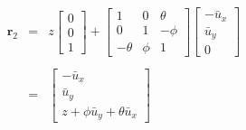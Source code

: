 \documentclass[a4paper]{report}
\begin{document}
\begin{eqnarray*}
\mathbf{r}_2&=&z\left[\begin{array}{c} 0\\ 0\\ 1\end{array} \right]+\left[\begin{array}{ccc} 1 & 0 & \theta\\ 0 & 1 & - \phi\\ -\theta & \phi & 1 \end{array}\right] \left[\begin{array}{c} -\bar{u}_x\\ \bar{u}_y\\ 0\end{array} \right]
\\
\\
&=& \left[\begin{array}{c} -\bar{u}_{x}\\ \bar{u}_{y}\\ z +\phi \bar{u}_{y} + \theta \bar{u}_{x} \end{array} \right]
\end{eqnarray*}
\end{document}
